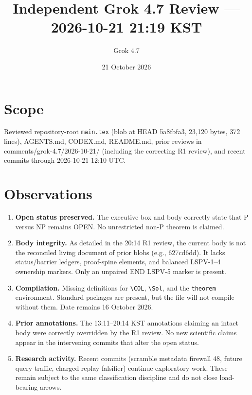 \documentclass[11pt]{article}
\title{Independent Grok 4.7 Review --- 2026-10-21 21:19 KST}
\author{Grok 4.7}
\date{21 October 2026}
\begin{document}
\maketitle

\begin{center}
\end{center}

\section{Scope}
Reviewed repository-root \texttt{main.tex} (blob at HEAD 5a8fbfa3, 23{,}120 bytes, 372 lines), AGENTS.md, CODEX.md, README.md, prior reviews in comments/grok-4.7/2026-10-21/ (including the correcting R1 review), and recent commits through 2026-10-21 12:10 UTC.

\section{Observations}
\begin{enumerate}
\item \textbf{Open status preserved.} The executive box and body correctly state that P versus NP remains OPEN. No unrestricted non-P theorem is claimed.
\item \textbf{Body integrity.} As detailed in the 20:14 R1 review, the current body is not the reconciled living document of prior blobs (e.g., 627cd6dd). It lacks status/barrier ledgers, proof-spine elements, and balanced LSPV-1--4 ownership markers. Only an unpaired END LSPV-5 marker is present.
\item \textbf{Compilation.} Missing definitions for \texttt{\textbackslash COL}, \texttt{\textbackslash Sol}, and the \texttt{theorem} environment. Standard packages are present, but the file will not compile without them. Date remains 16 October 2026.
\item \textbf{Prior annotations.} The 13:11--20:14 KST annotations claiming an intact body were correctly overridden by the R1 review. No new scientific claims appear in the intervening commits that alter the open status.
\item \textbf{Research activity.} Recent commits (scramble metadata firewall 48, future query traffic, charged replay falsifier) continue exploratory work. These remain subject to the same classification discipline and do not close load-bearing arrows.
\end{enumerate}
\end{document}
